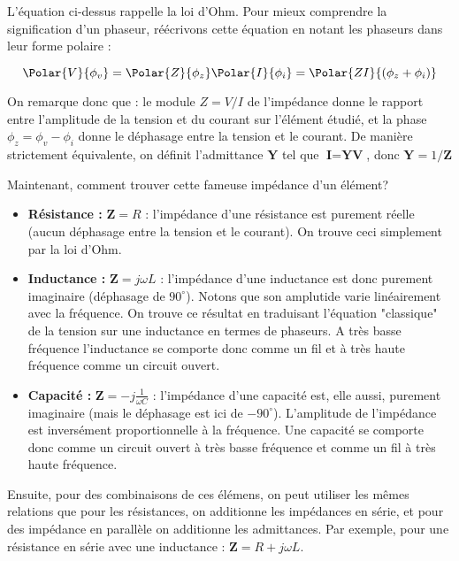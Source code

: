 L'équation ci-dessus rappelle la loi d'Ohm. Pour mieux comprendre la signification d'un phaseur, réécrivons cette équation en notant les phaseurs dans leur forme polaire :

\begin{equation}
\Polar{V}{\phi_v} = \Polar{Z}{\phi_z} \Polar{I}{\phi_i} = \Polar{ZI}{(\phi_z + \phi_i)}
\end{equation}

On remarque donc que : le module $Z = V/I$ de l'impédance donne le rapport entre l'amplitude de la tension et du courant sur l'élément étudié, et la phase $\phi_z = \phi_v - \phi_i$ donne le déphasage entre la tension et le courant. De manière strictement équivalente, on définit l'admittance $\textbf{Y}$ tel que $\textbf{I} = \textbf{Y} \textbf{V}$, donc $\textbf{Y} = 1/\textbf{Z}$

Maintenant, comment trouver cette fameuse impédance d'un élément?

\begin{itemize}
\item \textbf{Résistance :} $\textbf{Z} = R$ : l'impédance d'une résistance est purement réelle (aucun déphasage entre la tension et le courant). On trouve ceci simplement par la loi d'Ohm.
\item \textbf{Inductance :} $\textbf{Z} = j \omega L$ : l'impédance d'une inductance est donc purement imaginaire (déphasage de $90^{\circ}$). Notons que son amplutide varie linéairement avec la fréquence. On trouve ce résultat en traduisant l'équation "classique" de la tension sur une inductance en termes de phaseurs. A très basse fréquence l'inductance se comporte donc comme un fil et à très haute fréquence comme un circuit ouvert.
\item \textbf{Capacité :} $\textbf{Z} = -j \frac{1}{\omega C}$ : l'impédance d'une capacité est, elle aussi, purement imaginaire (mais le déphasage est ici de $-90^{\circ}$). L'amplitude de l'impédance est inversément proportionnelle à la fréquence. Une capacité se comporte donc comme un circuit ouvert à très basse fréquence et comme un fil à très haute fréquence.
\end{itemize}

Ensuite, pour des combinaisons de ces élémens, on peut utiliser les mêmes relations que pour les résistances, on additionne les impédances en série, et pour des impédance en parallèle on additionne les admittances. Par exemple, pour une résistance en série avec une inductance : $\textbf{Z} = R + j\omega L$.

